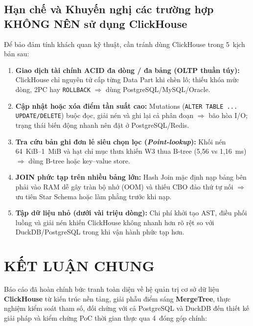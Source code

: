 \documentclass[13pt,a4paper]{report}
\begin{document}
\section{Hạn chế và Khuyến nghị các trường hợp KHÔNG NÊN sử dụng ClickHouse}
Để bảo đảm tính khách quan kỹ thuật, cần tránh dùng ClickHouse trong 5~kịch bản sau:
\begin{enumerate}
    \setlength{\itemsep}{3pt}\setlength{\parskip}{0pt}
    \item \textbf{Giao dịch tài chính ACID đa dòng / đa bảng (OLTP thuần túy):} ClickHouse chỉ nguyên tử cấp từng Data Part khi chèn lô; thiếu khóa mức dòng, 2PC hay \texttt{ROLLBACK} $\Rightarrow$ dùng PostgreSQL/MySQL/Oracle.
    \item \textbf{Cập nhật hoặc xóa điểm tần suất cao:} Mutations (\texttt{ALTER TABLE ... UPDATE/\allowbreak{}DELETE}) buộc đọc, giải nén và ghi lại cả phân đoạn $\Rightarrow$ bão hòa I/O; trạng thái biến động nhanh nên đặt ở PostgreSQL/Redis.
    \item \textbf{Tra cứu bản ghi đơn lẻ siêu chọn lọc (\textit{Point-lookup}):} Khối nén 64~KiB--1~MiB và hạt chỉ mục thưa khiến W3 thua B-tree (5,56 vs 1,16~ms) $\Rightarrow$ dùng B-tree hoặc key--value store.
    \item \textbf{JOIN phức tạp trên nhiều bảng lớn:} Hash Join mặc định nạp bảng bên phải vào RAM dễ gây tràn bộ nhớ (OOM) và thiếu CBO đảo thứ tự nối $\Rightarrow$ ưu tiên Star Schema hoặc làm phẳng trước khi nạp.
    \item \textbf{Tập dữ liệu nhỏ (dưới vài triệu dòng):} Chi phí khởi tạo AST, điều phối luồng và giải nén khiến ClickHouse không nhanh hơn rõ rệt so với DuckDB/PostgreSQL trong khi vận hành phức tạp hơn.
\end{enumerate}

\chapter*{KẾT LUẬN CHUNG}
{}

Báo cáo đã hoàn chỉnh bức tranh toàn diện về hệ quản trị cơ sở dữ liệu \textbf{ClickHouse} từ kiến trúc nền tảng, giải phẫu điểm sáng \textbf{MergeTree}, thực nghiệm kiểm soát tham số, đối chứng với cả PostgreSQL và DuckDB đến thiết kế giải pháp và kiểm chứng PoC thời gian thực qua 4~đóng góp chính:
\end{document}
